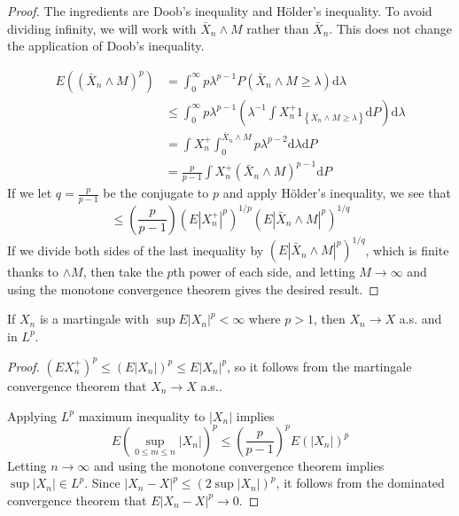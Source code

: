 \begin{proof}
The ingredients are  Doob's inequality and H\"older's inequality. 
To avoid dividing infinity, we will work with $\bar{X}_n\wedge M$ rather than $\bar{X}_n$. This does not change the application of Doob's inequality.\par
\begin{align*}
E((\bar{X}_n\wedge M)^p)&=\int_0^\infty p\lambda^{p-1}P(\bar{X}_n\wedge M\ge \lambda)\mathrm{d}\lambda\\
&\le \int_0^\infty p\lambda^{p-1}(\lambda^{-1}\int X_n^+1_{\left \{ \bar{X}_n\wedge M\ge\lambda \right \} }\mathrm{d}P)\mathrm{d}\lambda\\
&=\int X_n^+\int_0^{\bar{X}_n\wedge M}p\lambda^{p-2}\mathrm{d}\lambda\mathrm{d}P\\
&=\frac{p}{p-1}\int X_n^+(\bar{X}_n\wedge M)^{p-1}\mathrm{d}P
\end{align*}
If we let $q=\frac{p}{p-1}$ be the conjugate to $p$ and apply H\"older's inequality, we see that \[\le (\frac{p}{p-1})(E\left|X_n^+\right|^p)^{1/p}(E\left|\bar{X}_n\wedge M\right|^p)^{1/q}\]
If we divide both sides of the last inequality by $(E\left|\bar{X}_n\wedge M\right|^p)^{1/q}$, which is finite thanks to $\wedge M$, then take the $p$th power of each side, and letting $M\to\infty$ and using the monotone convergence theorem gives the desired result.
\end{proof}
\begin{theorem}
If $X_n$ is a martingale with $\sup E\left|X_n\right|^p<\infty$ where $p>1$, then $X_n\to X$ a.s. and in $L^p$.
\end{theorem}
\begin{proof}
$(EX_n^+)^p\le (E\left|X_n\right|)^p\le E\left|X_n\right|^p$, so it follows from the martingale convergence theorem that $X_n\to X$ a.s..\par
Applying $L^p$ maximum inequality to $\left|X_n\right|$ implies \[E(\sup_{0\le m\le n}\left|X_n\right|)^p\le (\frac{p}{p-1})^pE(\left|X_n\right|)^p\]
Letting $n\to\infty$ and using the monotone convergence theorem implies $\sup\left|X_n\right|\in L^p$. Since $\left|X_n-X\right|^p\le (2\sup\left|X_n\right|)^p$, it follows from the dominated convergence theorem that $E\left|X_n-X\right|^p\to 0$.
\end{proof}

